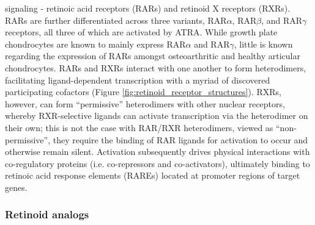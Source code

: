 \begin{refsection}
signaling - retinoic acid receptors (RARs) and retinoid X receptors (RXRs). RARs
are further differentiated across three variants, RAR${\alpha}$, RAR${\beta}$,
and RAR${\gamma}$ receptors, all three of which are activated by
ATRA.\cite{Chambon1996} While growth plate chondrocytes are known to mainly
express RAR${\alpha}$ and RAR${\gamma}$,\cite{Koyama1999} little is known
regarding the expression of RARs amongst osteoarthritic and healthy articular
chondrocytes. RARs and RXRs interact with one another to form heterodimers,
facilitating ligand-dependent transcription with a myriad of discovered
participating cofactors (Figure \ref{fig:retinoid_receptor_structures}). RXRs, however,
can form ``permissive'' heterodimers with other nuclear receptors, whereby
RXR-selective ligands can activate transcription via the heterodimer on their
own; this is not the case with RAR/RXR heterodimers, viewed as
``non-permissive'', they require the binding of RAR ligands for activation to
occur and otherwise remain silent.\cite{Altucci2007} Activation subsequently
drives physical interactions with co-regulatory proteins (i.e. co-repressors and
co-activators), ultimately binding to retinoic acid response elements (RAREs)
located at promoter regions of target genes.\cite{Germain2002,DeLera2007}

\subsubsection{Retinoid analogs}


\end{refsection}
